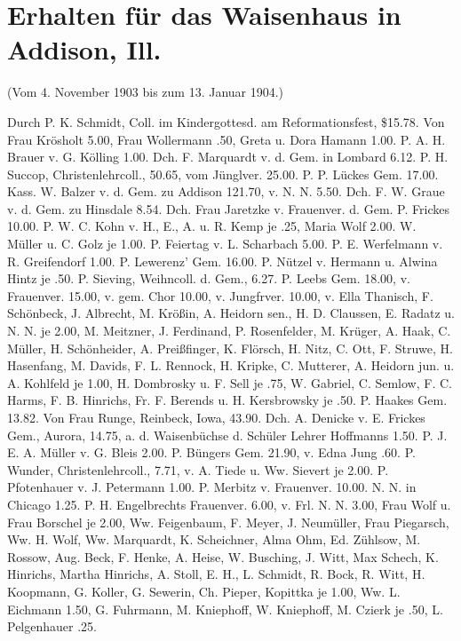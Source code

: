 \chapter[Erhalten für das Waisenhaus in …]{Erhalten für das Waisenhaus in Addison, Ill.}

(Vom 4. November 1903 bis zum 13. Januar 1904.)

Durch P. K. Schmidt, Coll. im Kindergottesd. am Reformationsfest, \$15.78. Von Frau Krösholt 5.00, Frau Wollermann .50, Greta u. Dora Hamann 1.00. P. A. H. Brauer v. G. Kölling 1.00. Dch. F. Marquardt v. d. Gem. in Lombard 6.12. P. H. Succop, Christenlehrcoll., 50.65, vom Jünglver. 25.00. P. P. Lückes Gem. 17.00. Kass. W. Balzer v. d. Gem. zu Addison 121.70, v. N. N. 5.50. Dch. F. W. Graue v. d. Gem. zu Hinsdale 8.54. Dch. Frau Jaretzke v. Frauenver. d. Gem. P. Frickes 10.00. P. W. C. Kohn v. H., E., A. u. R. Kemp je .25, Maria Wolf 2.00. W. Müller u. C. Golz je 1.00. P. Feiertag v. L. Scharbach 5.00. P. E. Werfelmann v. R. Greifendorf 1.00. P. Lewerenz' Gem. 16.00. P. Nützel v. Hermann u. Alwina Hintz je .50. P. Sieving, Weihncoll. d. Gem., 6.27. P. Leebs Gem. 18.00, v. Frauenver. 15.00, v. gem. Chor 10.00, v. Jungfrver. 10.00, v. Ella Thanisch, F. Schönbeck, J. Albrecht, M. Krößin, A. Heidorn sen., H. D. Claussen, E. Radatz u. N. N. je 2.00, M. Meitzner, J. Ferdinand, P. Rosenfelder, M. Krüger, A. Haak, C. Müller, H. Schönheider, A. Preißfinger, K. Flörsch, H. Nitz, C. Ott, F. Struwe, H. Hasenfang, M. Davids, F. L. Rennock, H. Kripke, C. Mutterer, A. Heidorn jun. u. A. Kohlfeld je 1.00, H. Dombrosky u. F. Sell je .75, W. Gabriel, C. Semlow, F. C. Harms, F. B. Hinrichs, Fr. F. Berends u. H. Kersbrowsky je .50. P. Haakes Gem. 13.82. Von Frau Runge, Reinbeck, Iowa, 43.90. Dch. A. Denicke v. E. Frickes Gem., Aurora, 14.75, a. d. Waisenbüchse d. Schüler Lehrer Hoffmanns 1.50. P. J. E. A. Müller v. G. Bleis 2.00. P. Büngers Gem. 21.90, v. Edna Jung .60. P. Wunder, Christenlehrcoll., 7.71, v. A. Tiede u. Ww. Sievert je 2.00. P. Pfotenhauer v. J. Petermann 1.00. P. Merbitz v. Frauenver. 10.00. N. N. in Chicago 1.25. P. H. Engelbrechts Frauenver. 6.00, v. Frl. N. N. 3.00, Frau Wolf u. Frau Borschel je 2.00, Ww. Feigenbaum, F. Meyer, J. Neumüller, Frau Piegarsch, Ww. H. Wolf, Ww. Marquardt, K. Scheichner, Alma Ohm, Ed. Zühlsow, M. Rossow, Aug. Beck, F. Henke, A. Heise, W. Busching, J. Witt, Max Schech, K. Hinrichs, Martha Hinrichs, A. Stoll, E. H., L. Schmidt, R. Bock, R. Witt, H. Koopmann, G. Koller, G. Sewerin, Ch. Pieper, Kopittka je 1.00, Ww. L. Eichmann 1.50, G. Fuhrmann, M. Kniephoff, W. Kniephoff, M. Czierk je .50, L. Pelgenhauer .25.

